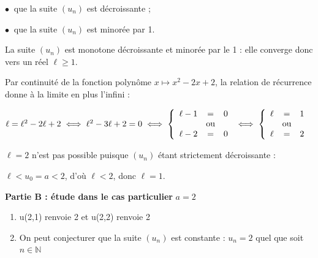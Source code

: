 \documentclass[10pt]{article}
\providecommand{\N}{\mathbb{N}}
\begin{document}
\begin{enumerate}
\begin{enumerate}
		$\bullet~$ que la suite $\left(u_n\right)$ est décroissante ;
		
		$\bullet~$ que la suite $\left(u_n\right)$ est minorée par 1.
		
		La suite  $\left(u_n\right)$ est monotone décroissante et minorée par le 1 : elle converge donc vers un réel $\ell \geqslant 1$.
		
		Par continuité de la fonction polynôme $x \longmapsto x^2 - 2x + 2$, la relation de récurrence donne à la limite en plus l'infini :
		
		$\ell = \ell^2 - 2\ell + 2 \iff \ell^2 - 3\ell + 2  = 0 \iff \left\{\begin{array}{l c l}
\ell - 1&=&0\\
&\text{ou}&\\
\ell - 2&=&0\\
\end{array}\right. \iff \left\{\begin{array}{l c l}
\ell &=&1\\
&\text{ou}&\\
\ell &=&2\\
\end{array}\right. $

$\ell = 2$ n'est pas possible puisque $\left(u_n\right)$ étant strictement décroissante : 

$\ell < u_0 = a < 2$, d'où $\ell < 2$, \:donc $\ell = 1$.
	\end{enumerate}
\end{enumerate}
	
	\bigskip
	
\textbf{Partie B : étude dans le cas particulier }\boldmath $a = 2$\unboldmath

\medskip

\begin{enumerate}
\item u(2,1) renvoie 2 et u(2,2) renvoie 2
















\item 



On peut conjecturer que la suite $\left(u_n\right)$ est constante : $u_n = 2$ quel que soit $n \in \N$
\end{enumerate}
\end{document}
